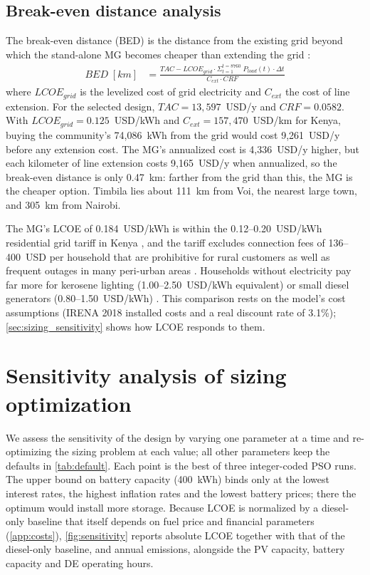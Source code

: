 \documentclass[final,3p,times]{elsarticle}
\begin{document}
\subsection{Break-even distance analysis}

The break-even distance (BED) is the distance from the existing grid beyond which the stand-alone MG becomes cheaper than extending the grid \cite{kaabeche2011a}:
\begin{align*}
    BED \; [km] & = \frac{TAC - LCOE_{grid} \cdot \Sigma_{t=1}^{t=8760}\; P_{load}(t)\cdot \Delta t}{C_{ext} \cdot CRF}
\end{align*}
where $LCOE_{grid}$ is the levelized cost of grid electricity and $C_{ext}$ the cost of line extension. For the selected design, $TAC = 13,597$~USD/y and $CRF = 0.0582$. With $LCOE_{grid} = 0.125$~USD/kWh \cite{LCOEgrid} and $C_{ext} = 157,470$~USD/km \cite{Cext} for Kenya, buying the community's 74,086~kWh from the grid would cost 9,261~USD/y before any extension cost. The MG's annualized cost is 4,336~USD/y higher, but each kilometer of line extension costs 9,165~USD/y when annualized, so the break-even distance is only 0.47~km: farther from the grid than this, the MG is the cheaper option. Timbila lies about 111~km from Voi, the nearest large town, and 305~km from Nairobi.

The MG's LCOE of 0.184~USD/kWh is within the 0.12--0.20~USD/kWh residential grid tariff in Kenya \cite{LCOEgrid}, and the tariff excludes connection fees of 136--400~USD per household that are prohibitive for rural customers \cite{quak_CBA, golumbeanu2013} as well as frequent outages in many peri-urban areas \cite{iea_africa2019}. Households without electricity pay far more for kerosene lighting (1.00--2.50~USD/kWh equivalent) \cite{tracy2012} or small diesel generators (0.80--1.50~USD/kWh) \cite{quak_CBA}. This comparison rests on the model's cost assumptions (IRENA 2018 installed costs and a real discount rate of 3.1\%); \cref{sec:sizing_sensitivity} shows how LCOE responds to them.

\section{Sensitivity analysis of sizing optimization\label{sec:sizing_sensitivity}}

We assess the sensitivity of the design by varying one parameter at a time and re-optimizing the sizing problem at each value; all other parameters keep the defaults in \cref{tab:default}. Each point is the best of three integer-coded PSO runs. The upper bound on battery capacity (400~kWh) binds only at the lowest interest rates, the highest inflation rates and the lowest battery prices; there the optimum would install more storage. Because LCOE is normalized by a diesel-only baseline that itself depends on fuel price and financial parameters (\cref{app:costs}), \cref{fig:sensitivity} reports absolute LCOE together with that of the diesel-only baseline, and annual emissions, alongside the PV capacity, battery capacity and DE operating hours.
\end{document}
